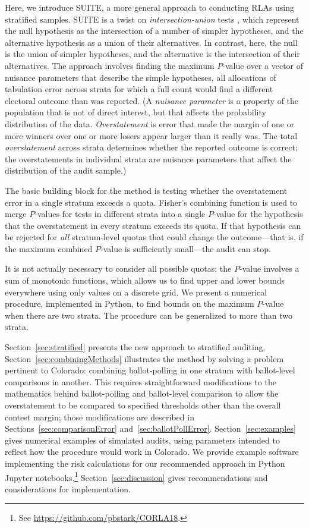 \documentclass[runningheads]{llncs}
\begin{document}
Here, we introduce SUITE, a more general approach to conducting RLAs using stratified samples.
SUITE is a twist on \emph{intersection-union} tests \cite{pesarinSalmaso10}, which represent the null hypothesis
as the intersection of a number of simpler hypotheses, and the alternative hypothesis as a union of their alternatives.
In contrast, here, the null is the union of simpler hypotheses, and the alternative is the intersection of their alternatives.
The approach involves finding the maximum $P$-value over a vector of nuisance parameters that describe the simple hypotheses, 
all allocations of tabulation error across strata for which a full count would find a different electoral outcome than was reported.
(A \emph{nuisance parameter} is a property of the population that is not of direct interest, but that affects the probability distribution of the data. 
\emph{Overstatement} is error that made the margin of one or more winners over one or more losers appear larger than it really was.
The total \emph{overstatement} across strata determines whether the reported outcome is correct; 
the overstatements in individual strata are nuisance parameters that affect the distribution of the audit sample.)

The basic building block for the method is testing whether the overstatement error in a single stratum exceeds a quota.
Fisher's combining function is used to merge $P$-values for tests in different strata into a single $P$-value for the hypothesis that the overstatement in every stratum exceeds its quota.
If that hypothesis can be rejected for \emph{all} stratum-level quotas that could change the outcome---that is, if the maximum combined $P$-value is sufficiently small---the audit can stop.

It is not actually necessary to consider all possible quotas: the $P$-value involves a sum of monotonic functions, which allows us to find upper and lower bounds everywhere using only values on a discrete grid.
We present a numerical procedure, implemented in Python,
to find bounds on the maximum $P$-value when there are two strata.
The procedure can be generalized to more than two strata.

Section~\ref{sec:stratified} presents the new approach to stratified auditing.
Section~\ref{sec:combiningMethods} illustrates the method by solving a problem pertinent to Colorado:
combining ballot-polling in one stratum with ballot-level comparisons in another.
This requires straightforward modifications to the mathematics behind ballot-polling and ballot-level comparison to allow the overstatement to be compared to specified thresholds other than the overall contest margin; those modifications are described in Sections~\ref{sec:comparisonError} and~\ref{sec:ballotPollError}.
Section~\ref{sec:examples} gives numerical examples of simulated audits, using parameters intended to reflect how the procedure would work in Colorado.
We provide example software implementing the risk calculations for
our recommended approach in Python Jupyter notebooks.\footnote{%
 See \url{https://github.com/pbstark/CORLA18}.
}
Section~\ref{sec:discussion} gives recommendations and
considerations for implementation.
\end{document}
